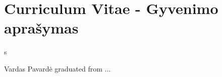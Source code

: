 \chapter*{Curriculum Vitae - Gyvenimo aprašymas}
\label{cha:cv}
s%



Vardas Pavardė graduated from ... 